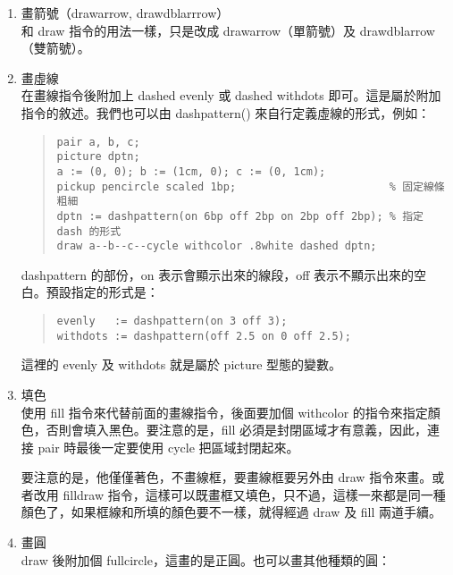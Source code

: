 \begin{enumerate}
  \item 畫箭號（{\ttfamily drawarrow, drawdblarrrow}）\\
        和 {\ttfamily draw} 指令的用法一樣，只是改成 {\ttfamily drawarrow}（單箭號）及 {\ttfamily drawdblarrow}（雙箭號）。

  \item 畫虛線\\
        在畫線指令後附加上 {\ttfamily dashed evenly} 或 {\ttfamily dashed withdots} 即可。這是屬於附加指令的敘述。我們也可以由 {\ttfamily dashpattern()} 來自行定義虛線的形式，例如：

        \begin{quote}
          \begin{verbatim}
pair a, b, c; 
picture dptn;
a := (0, 0); b := (1cm, 0); c := (0, 1cm);
pickup pencircle scaled 1bp;                        % 固定線條粗細
dptn := dashpattern(on 6bp off 2bp on 2bp off 2bp); % 指定 dash 的形式
draw a--b--c--cycle withcolor .8white dashed dptn;
\end{verbatim}
        \end{quote}

        {\ttfamily dashpattern} 的部份，{\ttfamily on} 表示會顯示出來的線段，{\ttfamily off} 表示不顯示出來的空白。預設指定的形式是：

        \begin{quote}
          \begin{verbatim}
evenly   := dashpattern(on 3 off 3);
withdots := dashpattern(off 2.5 on 0 off 2.5);
\end{verbatim}
        \end{quote}

        這裡的 {\ttfamily evenly} 及 {\ttfamily withdots} 就是屬於 picture 型態的變數。

  \item 填色\\
        使用 {\ttfamily fill} 指令來代替前面的畫線指令，後面要加個 {\ttfamily withcolor} 的指令來指定顏色，否則會填入黑色。要注意的是，{\ttfamily fill} 必須是封閉區域才有意義，因此，連接 pair 時最後一定要使用 {\ttfamily cycle} 把區域封閉起來。

        要注意的是，他僅僅著色，不畫線框，要畫線框要另外由 {\ttfamily draw} 指令來畫。或者改用 {\ttfamily filldraw} 指令，這樣可以既畫框又填色，只不過，這樣一來都是同一種顏色了，如果框線和所填的顏色要不一樣，就得經過 {\ttfamily draw} 及 {\ttfamily fill} 兩道手續。

  \item 畫圓\\
        {\ttfamily draw} 後附加個 {\ttfamily fullcircle}，這畫的是正圓。也可以畫其他種類的圓：


\end{enumerate}
